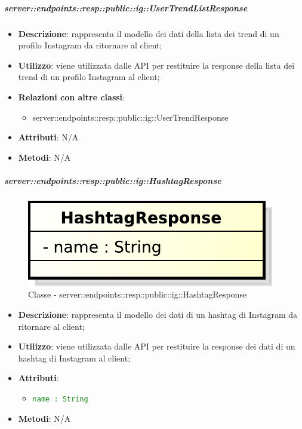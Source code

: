     \subparagraph{server::endpoints::resp::public::ig::UserTrendListResponse} %
    \label{subp:bdsm_app_server_endpoints_resp_public_ig_usertrendlistresponse}
    \begin{itemize}
      \item \textbf{Descrizione}: rappresenta il modello dei dati della lista dei trend di un profilo Instagram da ritornare al client;
      \item \textbf{Utilizzo}: viene utilizzata dalle API per restituire la response della lista dei trend di un profilo Instagram al client;
      \item \textbf{Relazioni con altre classi}:
        \begin{itemize}
          \item server::endpoints::resp::public::ig::UserTrendResponse
        \end{itemize}
    \item \textbf{Attributi}: N/A
    \item \textbf{Metodi}: N/A
      \end{itemize}

    \subparagraph{server::endpoints::resp::public::ig::HashtagResponse} %
    \label{subp:bdsm_app_server_endpoints_resp_public_ig_hashtagresponse}
  \begin{figure}[!htbp]
    \centering
    \centerline{\includegraphics[scale=0.6]{./images/server/classes/endpoints/ig/hashtag_response.pdf}}
    \caption{Classe - server::endpoints::resp::public::ig::HashtagResponse}
  \end{figure}
    \begin{itemize}
      \item \textbf{Descrizione}: rappresenta il modello dei dati di un hashtag di Instagram da ritornare al client;
      \item \textbf{Utilizzo}: viene utilizzata dalle API per restituire la response dei dati di un hashtag di Instagram al client;
    \item \textbf{Attributi}:
      \begin{itemize}
        \item \textcolor{forestgreen}{\texttt{name : String}}
      \end{itemize}
    \item \textbf{Metodi}: N/A
      \end{itemize}

